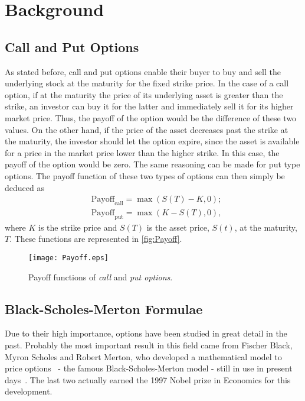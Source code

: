 \chapter{Background}
\label{chapter:background}
\section{Call and Put Options}
As stated before, call and put options enable their buyer to buy and sell the underlying stock at the maturity for the fixed strike price.
In the case of a call option, if at the maturity the price of its underlying asset is greater than the strike, an investor can buy it for the latter and immediately sell it for its higher market price. Thus, the payoff of the option would be the difference of these two values. On the other hand, if the price of the asset decreases past the strike at the maturity, the investor should let the option expire, since the asset is available for a price in the market price lower than the higher strike. In this case, the payoff of the option would be zero.
The same reasoning can be made for put type options.
The payoff function of these two types of options can then simply be deduced as
\begin{equation}\label{callput}
\begin{split}
&\text{Payoff}_\text{call}=\max\left(S(T)-K,0\right);\\
&\text{Payoff}_\text{put}=\max\left(K-S(T),0\right),
\end{split}
\end{equation}
\noindent where $K$ is the strike price and $S(T)$ is the asset price, $S(t)$, at the maturity, $T$. These functions are represented in \autoref{fig:Payoff}.

\begin{figure}[!htb]
    \centering
      \texttt{[image: Payoff.eps]}
      \caption[Payoff functions of call and put options]{Payoff functions of \emph{call} and \emph{put options}.}\label{fig:Payoff}
    \end{figure}
    
\section{Black-Scholes-Merton Formulae}
\label{section:Black-Scholes-Merton Formulae}
Due to their high importance, options have been studied in great detail in the past.
Probably the most important result in this field came from Fischer Black, Myron Scholes and Robert Merton, who developed a mathematical model to price options~\cite{Scholes} - the famous Black-Scholes-Merton model - still in use in present days~\cite{Wilmott}. The last two actually earned the 1997 Nobel prize in Economics for this development.

